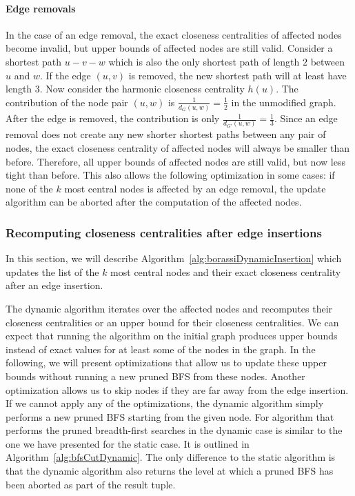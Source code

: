 \paragraph{Edge removals}
In the case of an edge removal, the exact closeness centralities of affected nodes become invalid, but upper bounds of affected nodes are still valid. Consider a shortest path $u - v - w$ which is also the only shortest path of length $2$ between $u$ and $w$. If the edge $(u, v)$ is removed, the new shortest path will at least have length $3$. Now consider the harmonic closeness centrality $h(u)$. The contribution of the node pair $(u, w)$ is $\frac{1}{d_G(u, w)} = \frac{1}{2}$ in the unmodified graph. After the edge is removed, the contribution is only $\frac{1}{d_{G'}(u, w)} = \frac{1}{3}$. Since an edge removal does not create any new shorter shortest paths between any pair of nodes, the exact closeness centrality of affected nodes will always be smaller than before. Therefore, all upper bounds of affected nodes are still valid, but now less tight than before. This also allows the following optimization in some cases: if none of the $k$ most central nodes is affected by an edge removal, the update algorithm can be aborted after the computation of the affected nodes. 


\subsubsection{Recomputing closeness centralities after edge insertions}
\label{sec:dynamicComplexRecomputation}
In this section, we will describe Algorithm~\ref{alg:borassiDynamicInsertion} which updates the list of the $k$ most central nodes and their exact closeness centrality after an edge insertion. 

The dynamic algorithm iterates over the affected nodes and recomputes their closeness centralities or an upper bound for their closeness centralities. We can expect that running the algorithm on the initial graph produces upper bounds instead of exact values for at least some of the nodes in the graph. In the following, we will present optimizations that allow us to update these upper bounds without running a new pruned BFS from these nodes. Another optimization allows us to skip nodes if they are far away from the edge insertion. If we cannot apply any of the optimizations, the dynamic algorithm simply performs a new pruned BFS starting from the given node. For algorithm that performs the pruned breadth-first searches in the dynamic case is similar to the one we have presented for the static case. It is outlined in Algorithm~\ref{alg:bfsCutDynamic}. The only difference to the static algorithm is that the dynamic algorithm also returns the level at which a pruned BFS has been aborted as part of the result tuple.


